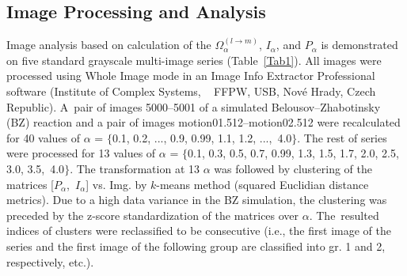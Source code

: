 \documentclass[entropy,article,accept,moreauthors,pdftex,10pt,a4paper]{mdpi}
\begin{document}
\subsection{Image Processing and Analysis}
\label{subsec:imageprocess}
Image analysis based on calculation of the $\Omega_\alpha^{(l \rightarrow m)}$, $I_\alpha$, and $P_\alpha$ is demonstrated on five standard grayscale multi-image series (Table~\ref{Tab1}). All images were processed using {Whole Image} mode in an Image Info Extractor Professional software ({Institute of Complex Systems},%
~ FFPW, USB, Nov\'{e} Hrady, Czech Republic). A~pair of images 5000--5001 of a simulated Belousov--Zhabotinsky (BZ) reaction and a pair of images {motion01.512}--{motion02.512}
were recalculated for 40 values of $\alpha$ = $\{$0.1, 0.2, ..., 0.9, 0.99, 1.1, 1.2, ...,~4.0$\}$. The rest of series were processed for 13 values of $\alpha$ = $\{$0.1, 0.3, 0.5, 0.7, 0.99, 1.3, 1.5, 1.7, 2.0, 2.5, 3.0, 3.5,~4.0$\}$. The transformation at 13 $\alpha$ was followed by clustering of the matrices \mbox{[$P_\alpha$, $I_\alpha$]} vs. Img. by $k$-means method (squared Euclidian distance metrics). Due to a high data variance in the BZ simulation, the clustering was preceded by the z-score standardization of the matrices over $\alpha$. The~resulted indices of clusters were reclassified to be consecutive (i.e., the first image of the series and the first image of the following group are classified into gr. 1 and 2, respectively, etc.).
\end{document}
